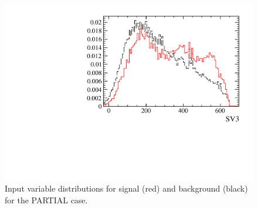 \begin{figure} [htb!]
\begin{center}
\includegraphics[scale=0.20]{figs/SV3PARTIAL.pdf}
\caption{Input variable distributions for signal (red) and background (black) for the PARTIAL case.
\label{fig:MVAhistos_PARTIAL}}
\end{center}
\end{figure}



